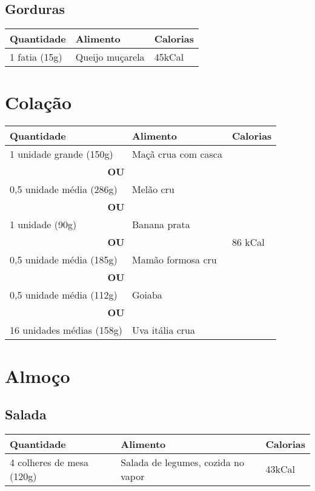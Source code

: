 \subsection*{Gorduras}

\begin{tabular}{p{8cm}p{8cm}p{1.5cm}}
\toprule
\textbf{Quantidade} & \textbf{Alimento} & \textbf{Calorias} \\
\midrule
1 fatia (15g) & Queijo muçarela & 45kCal \\
\bottomrule
\end{tabular}

\section*{Colação}

\begin{tabular}{p{8cm}p{8cm}p{1.5cm}}
\toprule
\textbf{Quantidade} & \textbf{Alimento} & \textbf{Calorias} \\
\midrule
1 unidade grande (150g) & Maçã crua com casca & \multirow{12}{*}{86 kCal}  \\
\cmidrule(lr){1-2}
\multicolumn{2}{c}{\textbf{OU}} \\
\cmidrule(lr){1-2}
0,5 unidade média (286g) & Melão cru \\
\cmidrule(lr){1-2}
\multicolumn{2}{c}{\textbf{OU}} \\
\cmidrule(lr){1-2}
1 unidade (90g) & Banana prata \\
\cmidrule(lr){1-2}
\multicolumn{2}{c}{\textbf{OU}} \\
\cmidrule(lr){1-2}
0,5 unidade média (185g) & Mamão formosa cru \\
\cmidrule(lr){1-2}
\multicolumn{2}{c}{\textbf{OU}} \\
\cmidrule(lr){1-2}
0,5 unidade média (112g) & Goiaba \\
\cmidrule(lr){1-2}
\multicolumn{2}{c}{\textbf{OU}} \\
\cmidrule(lr){1-2}
16 unidades médias (158g) & Uva itália crua \\
\bottomrule
\end{tabular}

\section*{Almoço}

\subsection*{Salada}
\begin{tabular}{p{8cm}p{8cm}p{1.5cm}}
\toprule
\textbf{Quantidade} & \textbf{Alimento} & \textbf{Calorias} \\
\midrule
4 colheres de mesa (120g) & Salada de legumes, cozida no vapor & 43kCal \\
\bottomrule
\end{tabular}

